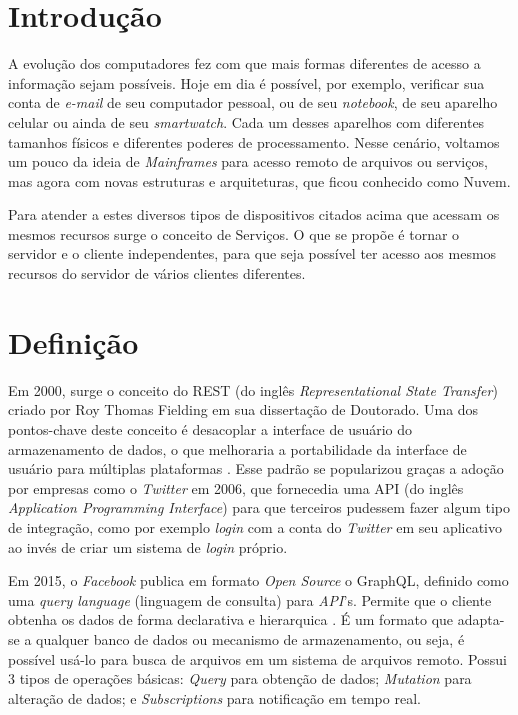 \section{Introdução}\label{introduuxe7uxe3o}

A evolução dos computadores fez com que mais formas diferentes de acesso
a informação sejam possíveis. Hoje em dia é possível, por exemplo,
verificar sua conta de \emph{e-mail} de seu computador pessoal, ou de
seu \emph{notebook}, de seu aparelho celular ou ainda de seu
\emph{smartwatch}. Cada um desses aparelhos com diferentes tamanhos
físicos e diferentes poderes de processamento. Nesse cenário, voltamos
um pouco da ideia de \emph{Mainframes} para acesso remoto de arquivos ou
serviços, mas agora com novas estruturas e arquiteturas, que ficou
conhecido como Nuvem.

Para atender a estes diversos tipos de dispositivos citados acima que
acessam os mesmos recursos surge o conceito de Serviços. O que se propõe
é tornar o servidor e o cliente independentes, para que seja possível
ter acesso aos mesmos recursos do servidor de vários clientes
diferentes.

\section{Definição}\label{definiuxe7uxe3o}

Em 2000, surge o conceito do REST (do inglês \emph{Representational
State Transfer}) criado por Roy Thomas Fielding em sua dissertação de
Doutorado. Uma dos pontos-chave deste conceito é desacoplar a interface
de usuário do armazenamento de dados, o que melhoraria a portabilidade
da interface de usuário para múltiplas plataformas \cite{rest:2000}.
Esse padrão se popularizou graças a adoção por empresas como o
\emph{Twitter} em 2006, que fornecedia uma API (do inglês
\emph{Application Programming Interface}) para que terceiros pudessem
fazer algum tipo de integração, como por exemplo \emph{login} com a
conta do \emph{Twitter} em seu aplicativo ao invés de criar um sistema
de \emph{login} próprio.

Em 2015, o \emph{Facebook} publica em formato \emph{Open Source} o
GraphQL, definido como uma \emph{query language} (linguagem de consulta)
para \emph{API}'s. Permite que o cliente obtenha os dados de forma
declarativa e hierarquica \cite{graphql:2015}. É um formato que
adapta-se a qualquer banco de dados ou mecanismo de armazenamento, ou
seja, é possível usá-lo para busca de arquivos em um sistema de arquivos
remoto. Possui 3 tipos de operações básicas: \emph{Query} para obtenção
de dados; \emph{Mutation} para alteração de dados; e
\emph{Subscriptions} para notificação em tempo real.

